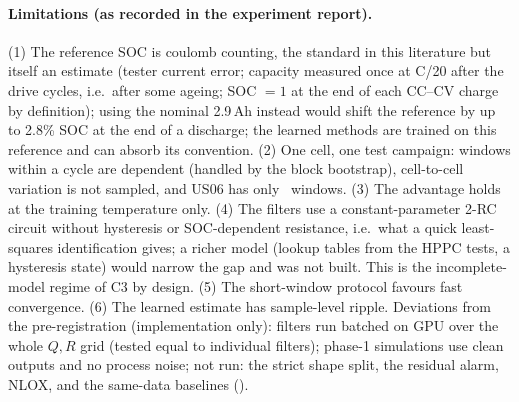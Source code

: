 \paragraph{Limitations (as recorded in the experiment report).} (1) The reference SOC is coulomb counting, the standard in this literature but itself an estimate (tester current error; capacity measured once at C/20 after the drive cycles, i.e.\ after some ageing; SOC $=1$ at the end of each CC--CV charge by definition); using the nominal 2.9\,Ah instead would shift the reference by up to 2.8\% SOC at the end of a discharge; the learned methods are trained on this reference and can absorb its convention. (2) One cell, one test campaign: windows within a cycle are dependent (handled by the block bootstrap), cell-to-cell variation is not sampled, and US06 has only \RealNwinUsZeroSix\ windows. (3) The advantage holds at the training temperature only. (4) The filters use a constant-parameter 2-RC circuit without hysteresis or SOC-dependent resistance, i.e.\ what a quick least-squares identification gives; a richer model (lookup tables from the HPPC tests, a hysteresis state) would narrow the gap and was not built. This is the incomplete-model regime of C3 by design. (5) The short-window protocol favours fast convergence. (6) The learned estimate has sample-level ripple. Deviations from the pre-registration (implementation only): filters run batched on GPU over the whole $Q,R$ grid (tested equal to individual filters); phase-1 simulations use clean outputs and no process noise; not run: the strict shape split, the residual alarm, NLOX, and the same-data baselines (\RealSameDataBaselines).

